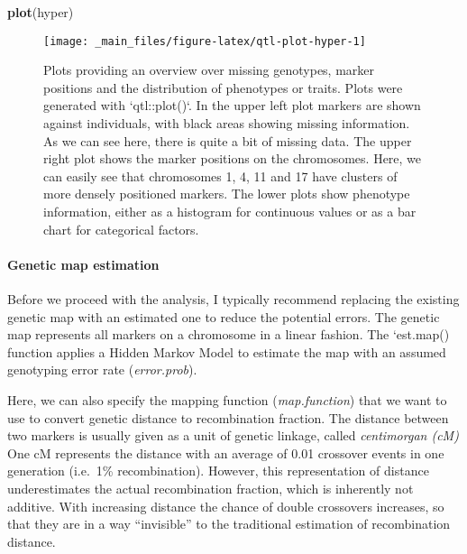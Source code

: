 \documentclass[12pt,]{krantz}
\newenvironment{Shaded}{\begin{snugshade}}{\end{snugshade}}
\newcommand{\KeywordTok}[1]{\textcolor[rgb]{0.27,0.27,0.27}{\textbf{{#1}}}}
\newcommand{\NormalTok}[1]{{#1}}
\let\oldparagraph\paragraph
\renewcommand{\paragraph}[1]{\oldparagraph{#1}\mbox{}}
\theoremstyle{definition}
\theoremstyle{definition}
\theoremstyle{remark}
\begin{document}
\begin{Shaded}
\begin{Highlighting}[]
\KeywordTok{plot}\NormalTok{(hyper)}
\end{Highlighting}
\end{Shaded}

\begin{figure}

{\centering \texttt{[image: \_main\_files/figure-latex/qtl-plot-hyper-1]} 

}

\caption{Plots providing an overview over missing genotypes, marker positions and the distribution of phenotypes or traits. Plots were generated with `qtl::plot()`. In the upper left plot markers are shown against individuals, with black areas showing missing information. As we can see here, there is quite a bit of missing data. The upper right plot shows the marker positions on the chromosomes. Here, we can easily see that chromosomes 1, 4, 11 and 17 have clusters of more densely positioned markers. The lower plots show phenotype information, either as a histogram for continuous values or as a bar chart for categorical factors.}\label{fig:qtl-plot-hyper}
\end{figure}

\paragraph{Genetic map estimation}\label{genetic-map-estimation}

Before we proceed with the analysis, I typically recommend replacing the
existing genetic map with an estimated one to reduce the potential
errors. The genetic map represents all markers on a chromosome in a
linear fashion. The `est.map() function applies a Hidden Markov Model
\citep{Lander01041987} to estimate the map with an assumed genotyping
error rate (\emph{error.prob}).

Here, we can also specify the mapping function (\emph{map.function})
that we want to use to convert genetic distance to recombination
fraction. The distance between two markers is usually given as a unit of
genetic linkage, called \emph{centimorgan (cM)} One cM represents the
distance with an average of 0.01 crossover events in one generation
(i.e.~1\% recombination). However, this representation of distance
underestimates the actual recombination fraction, which is inherently
not additive. With increasing distance the chance of double crossovers
increases, so that they are in a way ``invisible'' to the traditional
estimation of recombination distance.
\end{document}
